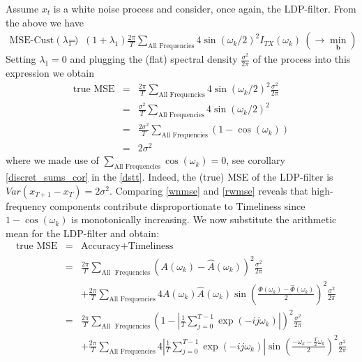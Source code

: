 \documentclass[a4paper]{book}
\begin{document}
Assume $x_t$ is a white noise process and consider, once again, the LDP-filter. From the above we have 
\begin{eqnarray}
\textrm{MSE-Cust}(\lambda_1)&=&(1+\lambda_1)\frac{2\pi}{ T}  \sum_{\textrm{All~Frequencies}} 4\sin\left(\omega_k/2\right)^2I_{TX}(\omega_k)~\left(\to\min_{\mathbf{b}}\right)\label{ast_cust_for_wn}
\end{eqnarray}
Setting $\lambda_1=0$ and plugging the (flat) spectral density $\displaystyle{\frac{\sigma^2}{2\pi}}$ of the process into this expression %
we obtain 
\begin{eqnarray}
\textrm{true~MSE}&=&\frac{2\pi}{ T}  \sum_{\textrm{All~Frequencies}} 4\sin(\omega_k/2)^2\frac{\sigma^2}{2\pi}\nonumber\\
&=&\frac{\sigma^2}{ T}  \sum_{\textrm{All~Frequencies}} 4\sin(\omega_k/2)^2\nonumber\\
&=&\frac{2\sigma^2}{ T}  \sum_{\textrm{All~Frequencies}} (1-\cos(\omega_k))\label{wnmse}\\
&=&2\sigma^2\nonumber
\end{eqnarray}
where we made use of $\sum_{\textrm{All~Frequencies}} \cos(\omega_k)=0$, see corollary \ref{discret_sums_cor} in the \ref{dstt}. Indeed, the (true) MSE of the LDP-filter is $Var(x_{T+1}-x_{T})=2\sigma^2$. Comparing \ref{wnmse} and \ref{rwmse} reveals that high-frequency components contribute disproportionate to Timeliness since $1-\cos(\omega_k)$ is monotonically increasing. We now substitute the arithmetic mean for the LDP-filter and obtain:
\begin{eqnarray}
\textrm{true~MSE}&=&\textrm{Accuracy+Timeliness}\nonumber\\
&=&\frac{2\pi}{ T} \sum_{\textrm{All ~Frequencies}} (A(\omega_k)-\hat{A}(\omega_k))^2 \frac{\sigma^2}{2\pi}\nonumber\\
&&+\frac{2\pi}{ T}  \sum_{\textrm{All~Frequencies}} 4A(\omega_k)\hat{A}(\omega_k)\sin\left(\frac{\Phi(\omega_k)-\hat{\Phi}(\omega_k)}{2}\right)^2\frac{\sigma^2}{2\pi}\nonumber\\
&=&\frac{2\pi}{ T} \sum_{\textrm{All ~Frequencies}} \left(1-\left|\frac{1}{T}\sum_{j=0}^{T-1}\exp(-ij\omega_k)\right|\right)^2\frac{\sigma^2}{2\pi} \nonumber\\
&&+\frac{2\pi}{ T}  \sum_{\textrm{All~Frequencies}} 4\left|\frac{1}{T}\sum_{j=0}^{T-1}\exp(-ij\omega_k)\right| \sin\left(\frac{-\omega_k-\frac{T}{2}\omega_k}{2}\right)^2\frac{\sigma^2}{2\pi}\nonumber
\end{eqnarray}
\end{document}
